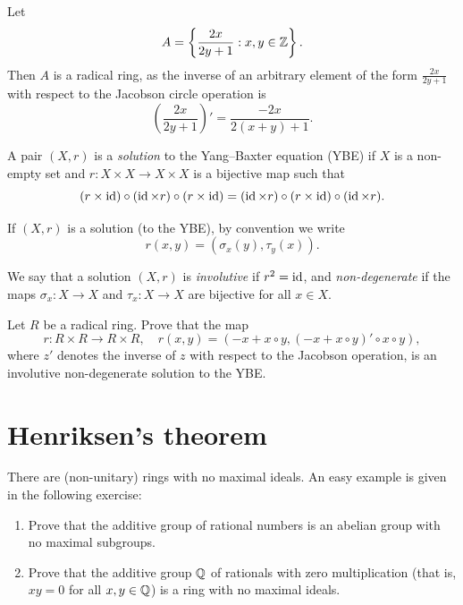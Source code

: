 \begin{optional}
\begin{example}
	Let 
	\[
	A=\left\{\frac{2x}{2y+1}:x,y\in\mathbb{Z}\right\}.
	\]
	Then $A$ is a radical ring, as the inverse of an arbitrary element of the form $\frac{2x}{2y+1}$
	with respect to the Jacobson circle operation 
	is 
    \[
	\left(\frac{2x}{2y+1}\right)'=\frac{-2x}{2(x+y)+1}.
	\]
\end{example}

\begin{definition}
A pair $(X,r)$ is a \emph{solution} to the Yang--Baxter equation (YBE) if $X$
is a non-empty set and $r\colon X\times X\to X\times X$ is a bijective map such
that  
\[
	(r\times\operatorname{id})\circ (\operatorname{id}\times r)\circ (r\times\operatorname{id})
	=(\operatorname{id}\times r)\circ (r\times\operatorname{id})\circ (\operatorname{id}\times r).
\]
\end{definition}

If $(X,r)$ is a solution (to the YBE), 
by convention we write 
\[
	r(x,y)=(\sigma_x(y),\tau_y(x)).
\]

We say that a solution $(X,r)$ is \emph{involutive} 
if $r^2=\operatorname{id}$, and \emph{non-degenerate} if the maps 
$\sigma_x\colon X\to X$ and 
$\tau_x\colon X\to X$ are bijective for all $x\in X$.

\begin{xca}
  Let $R$ be a radical ring. Prove that the map 
  \[
    r\colon R\times R\to R\times R,\quad
    r(x,y)=(-x+x\circ y,(-x+x\circ y)'\circ x\circ y),
  \]
  where $z'$ denotes the inverse of $z$ 
  with respect to the Jacobson operation, 
  is an involutive non-degenerate solution to the YBE. 
\end{xca}
\end{optional}

\section{Henriksen's theorem}
\lecture\label{sec:Henriksen}


There are (non-unitary) rings with no maximal ideals. An easy example is given
in the following exercise: 

\begin{exercise}
    \leavevmode
\label{xca:Q_no_maximals}
    \begin{enumerate}
        \item Prove that the additive group of rational numbers is an abelian group
            with no maximal subgroups.
        \item Prove that the additive group $\mathbb{Q}$ of rationals with  
            zero multiplication (that is, $xy=0$ for all $x,y\in\mathbb{Q}$) is a ring with no maximal ideals. 
    \end{enumerate}
\end{exercise}

